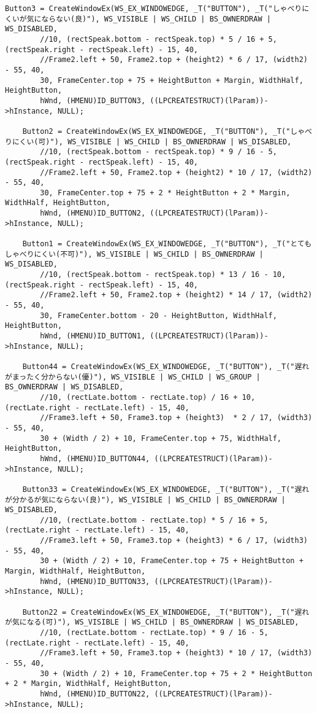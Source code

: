 \begin{lstlisting}[caption=window.cpp]
	Button3 = CreateWindowEx(WS_EX_WINDOWEDGE, _T("BUTTON"), _T("しゃべりにくいが気にならない(良)"), WS_VISIBLE | WS_CHILD | BS_OWNERDRAW | WS_DISABLED,
		//10, (rectSpeak.bottom - rectSpeak.top) * 5 / 16 + 5, (rectSpeak.right - rectSpeak.left) - 15, 40,
		//Frame2.left + 50, Frame2.top + (height2) * 6 / 17, (width2) - 55, 40,
		30, FrameCenter.top + 75 + HeightButton + Margin, WidthHalf, HeightButton,
		hWnd, (HMENU)ID_BUTTON3, ((LPCREATESTRUCT)(lParam))->hInstance, NULL);

	Button2 = CreateWindowEx(WS_EX_WINDOWEDGE, _T("BUTTON"), _T("しゃべりにくい(可)"), WS_VISIBLE | WS_CHILD | BS_OWNERDRAW | WS_DISABLED,
		//10, (rectSpeak.bottom - rectSpeak.top) * 9 / 16 - 5, (rectSpeak.right - rectSpeak.left) - 15, 40,
		//Frame2.left + 50, Frame2.top + (height2) * 10 / 17, (width2) - 55, 40,
		30, FrameCenter.top + 75 + 2 * HeightButton + 2 * Margin, WidthHalf, HeightButton,
		hWnd, (HMENU)ID_BUTTON2, ((LPCREATESTRUCT)(lParam))->hInstance, NULL);

	Button1 = CreateWindowEx(WS_EX_WINDOWEDGE, _T("BUTTON"), _T("とてもしゃべりにくい(不可)"), WS_VISIBLE | WS_CHILD | BS_OWNERDRAW | WS_DISABLED,
		//10, (rectSpeak.bottom - rectSpeak.top) * 13 / 16 - 10, (rectSpeak.right - rectSpeak.left) - 15, 40,
		//Frame2.left + 50, Frame2.top + (height2) * 14 / 17, (width2) - 55, 40,
		30, FrameCenter.bottom - 20 - HeightButton, WidthHalf, HeightButton,
		hWnd, (HMENU)ID_BUTTON1, ((LPCREATESTRUCT)(lParam))->hInstance, NULL);

	Button44 = CreateWindowEx(WS_EX_WINDOWEDGE, _T("BUTTON"), _T("遅れがまったく分からない(優)"), WS_VISIBLE | WS_CHILD | WS_GROUP | BS_OWNERDRAW | WS_DISABLED,
		//10, (rectLate.bottom - rectLate.top) / 16 + 10, (rectLate.right - rectLate.left) - 15, 40,
		//Frame3.left + 50, Frame3.top + (height3)  * 2 / 17, (width3) - 55, 40,
		30 + (Width / 2) + 10, FrameCenter.top + 75, WidthHalf, HeightButton,
		hWnd, (HMENU)ID_BUTTON44, ((LPCREATESTRUCT)(lParam))->hInstance, NULL);

	Button33 = CreateWindowEx(WS_EX_WINDOWEDGE, _T("BUTTON"), _T("遅れが分かるが気にならない(良)"), WS_VISIBLE | WS_CHILD | BS_OWNERDRAW | WS_DISABLED,
		//10, (rectLate.bottom - rectLate.top) * 5 / 16 + 5, (rectLate.right - rectLate.left) - 15, 40,
		//Frame3.left + 50, Frame3.top + (height3) * 6 / 17, (width3) - 55, 40,
		30 + (Width / 2) + 10, FrameCenter.top + 75 + HeightButton + Margin, WidthHalf, HeightButton,
		hWnd, (HMENU)ID_BUTTON33, ((LPCREATESTRUCT)(lParam))->hInstance, NULL);

	Button22 = CreateWindowEx(WS_EX_WINDOWEDGE, _T("BUTTON"), _T("遅れが気になる(可)"), WS_VISIBLE | WS_CHILD | BS_OWNERDRAW | WS_DISABLED,
		//10, (rectLate.bottom - rectLate.top) * 9 / 16 - 5, (rectLate.right - rectLate.left) - 15, 40,
		//Frame3.left + 50, Frame3.top + (height3) * 10 / 17, (width3) - 55, 40,
		30 + (Width / 2) + 10, FrameCenter.top + 75 + 2 * HeightButton + 2 * Margin, WidthHalf, HeightButton,
		hWnd, (HMENU)ID_BUTTON22, ((LPCREATESTRUCT)(lParam))->hInstance, NULL);


\end{lstlisting}
